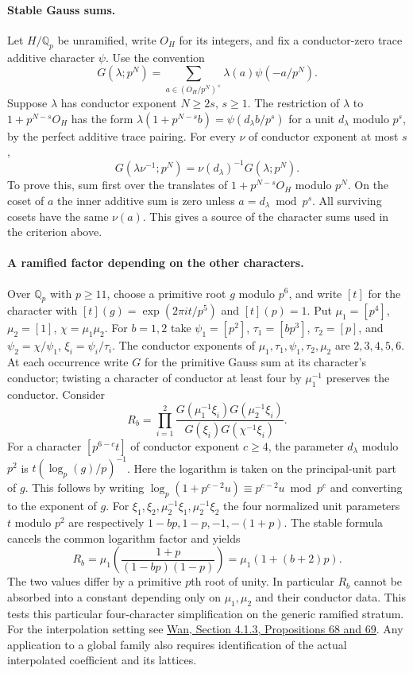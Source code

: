 \documentclass[11pt]{article}
\begin{document}
\paragraph{Stable Gauss sums.}
Let $H/\mathbb Q_p$ be unramified, write $O_H$ for its integers,
and fix a conductor-zero trace additive character $\psi$.
Use the convention
\[
 G(\lambda;p^N)=
 \sum_{a\in(O_H/p^N)^\times}\lambda(a)\psi(-a/p^N).
\]
Suppose $\lambda$ has conductor exponent $N\ge2s$, $s\ge1$.
The restriction of $\lambda$ to $1+p^{N-s}O_H$ has the form
$\lambda(1+p^{N-s}b)=\psi(d_\lambda b/p^s)$ for a unit
$d_\lambda$ modulo $p^s$, by the perfect additive trace pairing.
For every $\nu$ of conductor exponent at most $s$,
\[
 G(\lambda\nu^{-1};p^N)=\nu(d_\lambda)^{-1}G(\lambda;p^N).
\]
To prove this, sum first over the translates of
$1+p^{N-s}O_H$ modulo $p^N$. On the coset of $a$ the inner
additive sum is zero unless $a=d_\lambda\bmod p^s$.
All surviving cosets have the same $\nu(a)$. This gives a source
of the character sums used in the criterion above.

\paragraph{A ramified factor depending on the other characters.}
Over $\mathbb Q_p$ with $p\ge11$, choose a primitive root $g$ modulo
$p^6$, and write $[t]$ for the character with $[t](g)=
\exp(2\pi i t/p^5)$ and $[t](p)=1$. Put $\mu_1=[p^4]$, $\mu_2=[1]$,
$\chi=\mu_1\mu_2$. For $b=1,2$ take $\psi_1=[p^2]$,
$\tau_1=[bp^3]$, $\tau_2=[p]$, and
$\psi_2=\chi/\psi_1$, $\xi_i=\psi_i/\tau_i$. The conductor
exponents of $\mu_1,\tau_1,\psi_1,\tau_2,\mu_2$ are $2,3,4,5,6$.
At each occurrence write $G$ for the primitive Gauss sum at its
character's conductor; twisting a character of conductor at least
four by $\mu_1^{-1}$ preserves the conductor. Consider
\[
 R_b=\prod_{i=1}^2
 \frac{G(\mu_1^{-1}\xi_i)G(\mu_2^{-1}\xi_i)}
      {G(\xi_i)G(\chi^{-1}\xi_i)} .
\]
For a character $[p^{6-c}t]$ of conductor exponent $c\ge4$, the
parameter $d_\lambda$ modulo $p^2$ is
$t(\log_p(g)/p)^{-1}$. Here the logarithm is taken on the
principal-unit part of $g$. This follows by writing
$\log_p(1+p^{c-2}u)\equiv p^{c-2}u\bmod p^c$ and converting
to the exponent of $g$. For $\xi_1,\xi_2,\mu_2^{-1}\xi_1,
\mu_2^{-1}\xi_2$ the four normalized unit parameters $t$ modulo
$p^2$ are respectively $1-bp,1-p,-1,-(1+p)$.
The stable formula cancels the common logarithm factor and yields
\[
 R_b=\mu_1\left(\frac{1+p}{(1-bp)(1-p)}\right)
    =\mu_1(1+(b+2)p).
\]
The two values differ by a primitive $p$th root of unity.
In particular $R_b$ cannot be absorbed into a constant depending
only on $\mu_1,\mu_2$ and their conductor data. This tests this
particular four-character simplification on the generic ramified
stratum. For the interpolation setting see
\href{https://doi.org/10.1017/fms.2015.16}{Wan, Section 4.1.3,
Propositions 68 and 69}. Any application to a global family also
requires identification of the actual interpolated coefficient and
its lattices.
\end{document}
